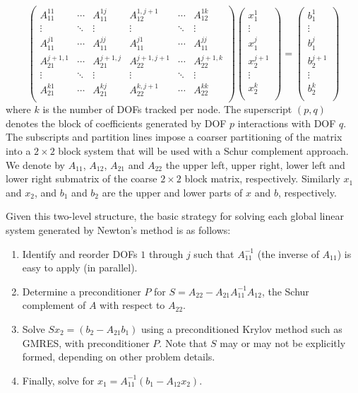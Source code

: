 \documentclass[twosided]{report}
\begin{document}
$$
\left(
\begin{array}{ccc|ccc} A_{11}^{11} & \cdots & A_{11}^{1j} &
A_{12}^{1,j+1} & \cdots & A_{12}^{1k} \\ \vdots & \ddots &
\vdots & \vdots & \ddots & \vdots \\ A_{11}^{j1} & \cdots &
A_{11}^{jj} & A_{11}^{j1} & \cdots & A_{11}^{jj} \\\hline
A_{21}^{j+1,1} & \cdots & A_{21}^{j+1,j} & A_{22}^{j+1,j+1}
& \cdots & A_{22}^{j+1,k} \\ \vdots & \ddots & \vdots &
\vdots & \ddots & \vdots \\ A_{21}^{k1} & \cdots &
A_{21}^{kj} & A_{22}^{k,j+1} & \cdots & A_{22}^{kk} \\
\end{array} \right) \left( \begin{array}{c} x_1^1 \\ \vdots
\\ x_1^j \\\hline x_2^{j+1} \\ \vdots \\ x_2^k \\
\end{array} \right) = \left( \begin{array}{c} b_1^1 \\
\vdots \\ b_1^j \\\hline b_2^{j+1} \\ \vdots \\ b_2^k \\
\end{array} \right)
$$
where $k$ is the number of DOFs
tracked per node. The superscript $(p, q)$ denotes the block
of coefficients generated by DOF $p$ interactions with DOF
$q$. The subscripts and partition lines impose a coarser
partitioning of the matrix into a $2\times 2$
block system that
will be used with a Schur complement approach. We denote by
$A_{11}$, $A_{12}$, $A_{21}$ and $A_{22}$ the upper left,
upper right, lower left and lower right submatrix of the
coarse $2\times 2$ block matrix, respectively. Similarly $x_1$
and $x_2$, and $b_1$ and $b_2$ are the upper and lower parts
of $x$ and $b$, respectively.

Given this two-level
structure, the basic strategy for solving each global linear
system generated by Newton's method is as follows:
\begin{enumerate}
\item Identify and reorder DOFs $1$
through $j$ such that $A_{11}^{-1}$ (the inverse of
$A_{11}$) is easy to apply (in parallel).
\item Determine a
preconditioner $P$ for $S = A_{22} -
A_{21}A_{11}^{-1}A_{12}$,
the Schur complement of $A$ with
respect to $A_{22}$.
\item Solve $Sx_2 = (b_2 - A_{21}b_1)$
using a preconditioned Krylov method such as GMRES, with
preconditioner $P$. Note that $S$ may or may not be
explicitly formed, depending on other problem details.
\item
Finally, solve for $x_1 = A_{11}^{-1}(b_1 - A_{12}x_2)$.
\end{enumerate}
\end{document}
